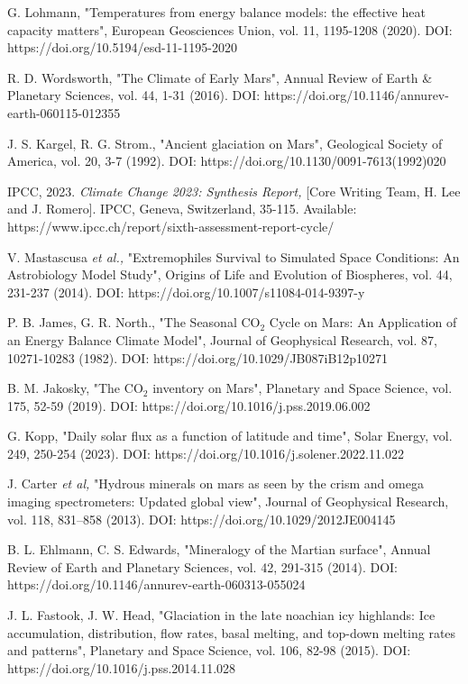 \documentclass[12pt,onecolumn]{revtex4-2}    %
\begin{document}
\begin{thebibliography}{}
 G. Lohmann, "Temperatures from energy balance models: the effective heat capacity matters", European Geosciences Union, vol. 11, 1195-1208 (2020). DOI: 
https://doi.org/10.5194/esd-11-1195-2020

 R. D. Wordsworth, "The Climate of Early Mars", Annual Review of Earth \& Planetary Sciences, vol. 44, 1-31 (2016). DOI: https://doi.org/10.1146/annurev-earth-060115-012355

 J. S. Kargel, R. G. Strom., "Ancient glaciation on Mars", Geological Society of America, vol. 20, 3-7 (1992). DOI: https://doi.org/10.1130/0091-7613(1992)020%

 IPCC, 2023. \textit{Climate Change 2023: Synthesis Report,} [Core Writing Team, H. Lee and J. Romero]. IPCC, Geneva, Switzerland, 35-115. Available: https://www.ipcc.ch/report/sixth-assessment-report-cycle/

 V. Mastascusa \textit{et al.,} "Extremophiles Survival to Simulated Space Conditions: An Astrobiology Model Study", Origins of Life and Evolution of Biospheres, vol. 44, 231-237 (2014). DOI: https://doi.org/10.1007/s11084-014-9397-y

 P. B. James, G. R. North., "The Seasonal $\mathrm{CO_2}$ Cycle on Mars: An Application of an Energy Balance Climate Model", Journal of Geophysical Research, vol. 87, 10271-10283 (1982). DOI: https://doi.org/10.1029/JB087iB12p10271

 B. M. Jakosky, "The $\mathrm{CO_2}$ inventory on Mars", Planetary and Space Science, vol. 175, 52-59 (2019). DOI: https://doi.org/10.1016/j.pss.2019.06.002

 G. Kopp, "Daily solar flux as a function of latitude and time", Solar Energy, vol. 249, 250-254 (2023). DOI: https://doi.org/10.1016/j.solener.2022.11.022

 J. Carter \textit{et al,} "Hydrous minerals on mars as seen
by the crism and omega imaging spectrometers: Updated global view", Journal of Geophysical
Research, vol. 118, 831–858 (2013). DOI: https://doi.org/10.1029/2012JE004145

 B. L. Ehlmann, C. S. Edwards, "Mineralogy of the Martian surface", Annual Review of Earth and Planetary Sciences, vol. 42, 291-315 (2014). DOI: https://doi.org/10.1146/annurev-earth-060313-055024

 J. L. Fastook, J. W. Head, "Glaciation in the late noachian icy highlands: Ice accumulation,
distribution, flow rates, basal melting, and top-down melting rates and patterns", Planetary and
Space Science, vol. 106, 82-98 (2015). DOI: https://doi.org/10.1016/j.pss.2014.11.028


\end{thebibliography}
\end{document}
